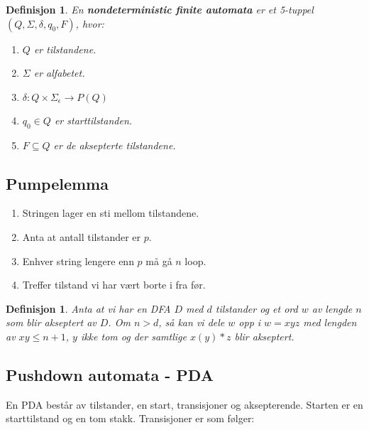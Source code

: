 \documentclass[11pt,a4paper]{article}
\begin{document}
\theoremstyle{mytheoremstyle}
\newtheorem{nfa}{Definisjon}[section]
\begin{nfa}
En \textbf{nondeterministic finite automata} er et 5-tuppel $(Q, \Sigma, \delta, q_0, F)$, hvor:
\begin{enumerate}
	\item{$Q$ er tilstandene.}
	\item{$\Sigma$ er alfabetet.}
	\item{$\delta : Q \times \Sigma_{\epsilon} \longrightarrow P(Q)$}
	\item{$q_0 \in Q$ er starttilstanden.}
	\item{$F \subseteq Q$ er de aksepterte tilstandene.}
\end{enumerate}
\end{nfa}

\subsection{Pumpelemma}
\begin{enumerate}
	\item{Stringen lager en sti mellom tilstandene.}
	\item{Anta at antall tilstander er $p$.}
	\item{Enhver string lengere enn $p$ må gå $n$ loop.}
	\item{Treffer tilstand vi har vært borte i fra før.}
\end{enumerate}

\theoremstyle{mytheoremstyle}
\newtheorem{pumpe}{Definisjon}[section]
\begin{pumpe}
Anta at vi har en DFA $D$ med $d$ tilstander og et ord $w$ av lengde $n$ som blir akseptert av $D$. Om $n > d$, så kan vi dele $w$ opp i $w = xyz$ med lengden av $xy \leq n + 1$, $y$ ikke tom og der samtlige $x(y)*z$ blir akseptert.
\end{pumpe}

\subsection{Pushdown automata - PDA}
En PDA består av tilstander, en start, transisjoner og aksepterende.
Starten er en starttilstand og en tom stakk. Transisjoner er som følger:


\begin{center}
\end{center}
\end{document}
